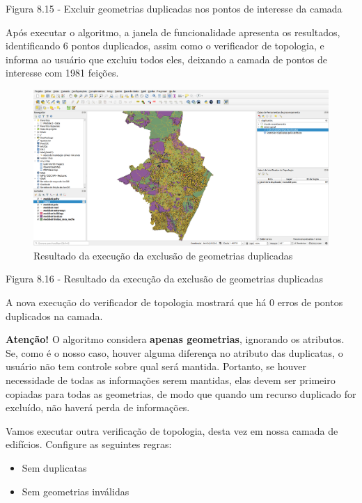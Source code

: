 \documentclass[
]{book}
\providecommand{\tightlist}{%
  \setlength{\itemsep}{0pt}\setlength{\parskip}{0pt}}
\begin{document}
Figura 8.15 - Excluir geometrias duplicadas nos pontos de interesse da camada

Após executar o algoritmo, a janela de funcionalidade apresenta os resultados, identificando 6 pontos duplicados, assim como o verificador de topologia, e informa ao usuário que excluiu todos eles, deixando a camada de pontos de interesse com 1981 feições.

\begin{figure}
\centering
\includegraphics{media/modulo8/fig816.png}
\caption{Resultado da execução da exclusão de geometrias duplicadas}
\end{figure}

Figura 8.16 - Resultado da execução da exclusão de geometrias duplicadas

A nova execução do verificador de topologia mostrará que há 0 erros de pontos duplicados na camada.

\textbf{Atenção!} O algoritmo considera \textbf{apenas geometrias}, ignorando os atributos. Se, como é o nosso caso, houver alguma diferença no atributo das duplicatas, o usuário não tem controle sobre qual será mantida. Portanto, se houver necessidade de todas as informações serem mantidas, elas devem ser primeiro copiadas para todas as geometrias, de modo que quando um recurso duplicado for excluído, não haverá perda de informações.

Vamos executar outra verificação de topologia, desta vez em nossa camada de edifícios. Configure as seguintes regras:

\begin{itemize}
\tightlist
\item
  Sem duplicatas
\item
  Sem geometrias inválidas
\end{itemize}
\end{document}
